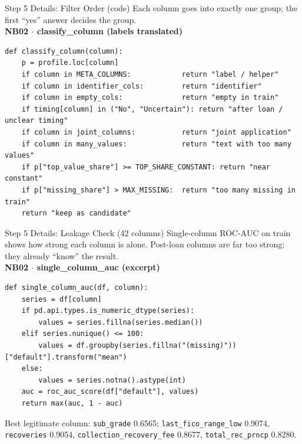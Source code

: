 \documentclass{beamer}
\newcommand{\code}[1]{\texttt{\small #1}}
\begin{document}
\begin{frame}[fragile]{Step 5 Details: Filter Order (code)}
  Each column goes into exactly one group; the first ``yes'' answer decides the group.\\[0.1cm]
  \textbf{\scriptsize NB02 $\cdot$ classify\_column (labels translated)}
\begin{lstlisting}
def classify_column(column):
    p = profile.loc[column]
    if column in META_COLUMNS:            return "label / helper"
    if column in identifier_cols:         return "identifier"
    if column in empty_cols:              return "empty in train"
    if timing[column] in ("No", "Uncertain"): return "after loan / unclear timing"
    if column in joint_columns:           return "joint application"
    if column in many_values:             return "text with too many values"
    if p["top_value_share"] >= TOP_SHARE_CONSTANT: return "near constant"
    if p["missing_share"] > MAX_MISSING:  return "too many missing in train"
    return "keep as candidate"
\end{lstlisting}
\end{frame}

\begin{frame}[fragile]{Step 5 Details: Leakage Check (42 columns)}
  Single-column ROC-AUC on train shows how strong each column is alone. Post-loan columns are far too strong: they already ``know'' the result.\\[0.1cm]
  \textbf{\scriptsize NB02 $\cdot$ single\_column\_auc (excerpt)}
\begin{lstlisting}
def single_column_auc(df, column):
    series = df[column]
    if pd.api.types.is_numeric_dtype(series):
        values = series.fillna(series.median())
    elif series.nunique() <= 100:
        values = df.groupby(series.fillna("(missing)"))["default"].transform("mean")
    else:
        values = series.notna().astype(int)
    auc = roc_auc_score(df["default"], values)
    return max(auc, 1 - auc)
\end{lstlisting}
  \scriptsize Best legitimate column: \code{sub\_grade} 0.6565; \code{last\_fico\_range\_low} 0.9074, \code{recoveries} 0.9054, \code{collection\_recovery\_fee} 0.8677, \code{total\_rec\_prncp} 0.8280.
\end{frame}
\end{document}
